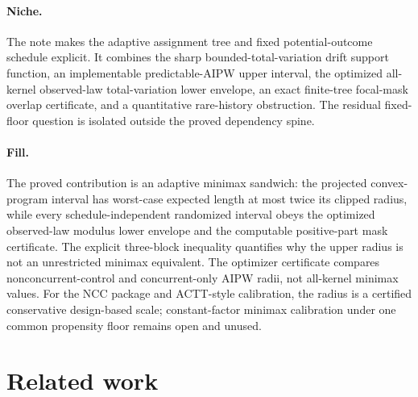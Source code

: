 \documentclass{article}
\begin{document}
\paragraph{Niche.} The note makes the adaptive assignment tree and fixed potential-outcome schedule explicit. It combines the sharp bounded-total-variation drift support function, an implementable predictable-AIPW upper interval, the optimized all-kernel observed-law total-variation lower envelope, an exact finite-tree focal-mask overlap certificate, and a quantitative rare-history obstruction. The residual fixed-floor question is isolated outside the proved dependency spine.

\paragraph{Fill.} The proved contribution is an adaptive minimax sandwich: the projected convex-program interval has worst-case expected length at most twice its clipped radius, while every schedule-independent randomized interval obeys the optimized observed-law modulus lower envelope and the computable positive-part mask certificate. The explicit three-block inequality quantifies why the upper radius is not an unrestricted minimax equivalent. The optimizer certificate compares nonconcurrent-control and concurrent-only AIPW radii, not all-kernel minimax values. For the NCC package and ACTT-style calibration, the radius is a certified conservative design-based scale; constant-factor minimax calibration under one common propensity floor remains open and unused.

\section{Related work}
\end{document}

